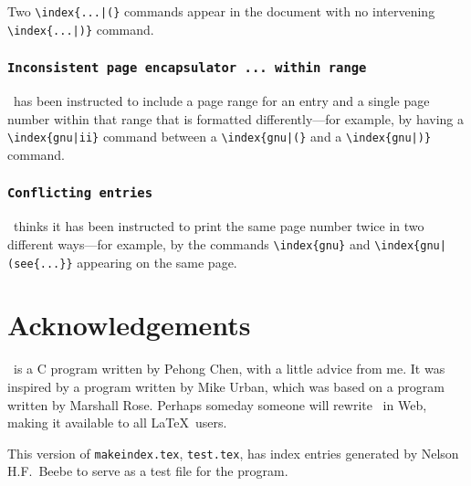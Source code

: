 Two \verb/\index{...|(}/ commands appear in the document with no intervening
\verb/\index{...|)}/ command.



\subsubsection*{\tt Inconsistent page encapsulator ... within range}

\MakeIndex\ has been instructed to include a page
range%
for an entry
and a single page number within that range that is formatted
differently---for example, by having a
\verb+\index{gnu|ii}+ command between a \verb+\index{gnu|(}+
and a \verb+\index{gnu|)}+ command.


\subsubsection*{\tt Conflicting entries}

\MakeIndex\ thinks it has been instructed to print the same page number
twice in two different ways---for example, by the commands
\verb|\index{gnu}| and \verb/\index{gnu|(see{...}}/ appearing on the
same page.



\section*{Acknowledgements}

\MakeIndex\ is a C
 program written by Pehong Chen,%
with a little
advice from me.  It was inspired by a program written by Mike Urban,%
which was based on a program written by Marshall Rose.%
  Perhaps someday
someone will rewrite \MakeIndex\ in Web,%
making it available to all
\LaTeX\ users.

This version of {\tt makeindex.\-tex}, {\tt test.\-tex}, has index
entries generated by Nelson H.F.~Beebe%
to serve as a test file for the
\MakeIndex{} program.





